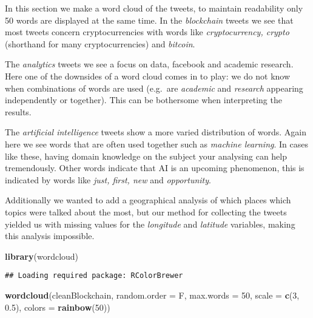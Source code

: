 \documentclass[]{article}
\newenvironment{Shaded}{\begin{snugshade}}{\end{snugshade}}
\newcommand{\KeywordTok}[1]{\textcolor[rgb]{0.13,0.29,0.53}{\textbf{#1}}}
\newcommand{\DataTypeTok}[1]{\textcolor[rgb]{0.13,0.29,0.53}{#1}}
\newcommand{\DecValTok}[1]{\textcolor[rgb]{0.00,0.00,0.81}{#1}}
\newcommand{\FloatTok}[1]{\textcolor[rgb]{0.00,0.00,0.81}{#1}}
\newcommand{\NormalTok}[1]{#1}
\begin{document}
In this section we make a word cloud of the tweets, to maintain
readability only 50 words are displayed at the same time. In the
\emph{blockchain} tweets we see that most tweets concern
cryptocurrencies with words like \emph{cryptocurrency, crypto}
(shorthand for many cryptocurrencies) and \emph{bitcoin}.

The \emph{analytics} tweets we see a focus on data, facebook and
academic research. Here one of the downsides of a word cloud comes in to
play: we do not know when combinations of words are used (e.g.~are
\emph{academic} and \emph{research} appearing independently or
together). This can be bothersome when interpreting the results.

The \emph{artificial intelligence} tweets show a more varied
distribution of words. Again here we see words that are often used
together such as \emph{machine learning}. In cases like these, having
domain knowledge on the subject your analysing can help tremendously.
Other words indicate that AI is an upcoming phenomenon, this is
indicated by words like \emph{just, first, new} and \emph{opportunity}.

Additionally we wanted to add a geographical analysis of which places
which topics were talked about the most, but our method for collecting
the tweets yielded us with missing values for the \emph{longitude} and
\emph{latitude} variables, making this analysis impossible.

\begin{Shaded}
\begin{Highlighting}[]
\KeywordTok{library}\NormalTok{(wordcloud)}
\end{Highlighting}
\end{Shaded}

\begin{verbatim}
## Loading required package: RColorBrewer
\end{verbatim}

\begin{Shaded}
\begin{Highlighting}[]
\KeywordTok{wordcloud}\NormalTok{(cleanBlockchain, }\DataTypeTok{random.order =}\NormalTok{ F, }\DataTypeTok{max.words =} \DecValTok{50}\NormalTok{, }\DataTypeTok{scale =} \KeywordTok{c}\NormalTok{(}\DecValTok{3}\NormalTok{, }\FloatTok{0.5}\NormalTok{), }\DataTypeTok{colors =} \KeywordTok{rainbow}\NormalTok{(}\DecValTok{50}\NormalTok{))}
\end{Highlighting}
\end{Shaded}
\end{document}
